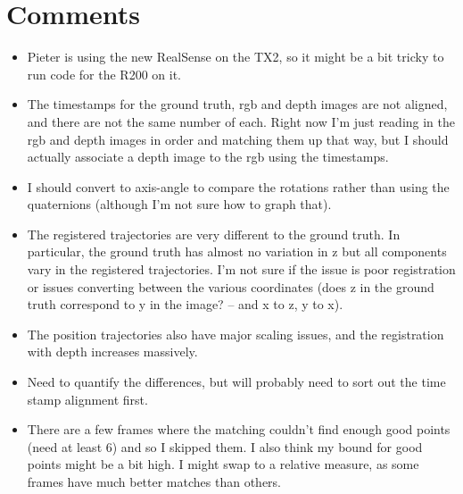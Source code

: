 \documentclass[12pt,a4paper]{article}
\begin{document}
\section{Comments}
\begin{itemize}
\item Pieter is using the new RealSense on the TX2, so it might be a bit tricky to run code for the R200 on it. 
\item The timestamps for the ground truth, rgb and depth images are not aligned, and there are not the same number of each. Right now I'm just reading in the rgb and depth images in order and matching them up that way, but I should actually associate a depth image to the rgb using the timestamps.
\item I should convert to axis-angle to compare the rotations rather than using the quaternions (although I'm not sure how to graph that).
\item The registered trajectories are very different to the ground truth. In particular, the ground truth has almost no variation in z but all components vary in the registered trajectories. I'm not sure if the issue is poor registration or issues converting between the various coordinates (does z in the ground truth correspond to y in the image? -- and x to z, y to x).
\item The position trajectories also have major scaling issues, and the registration with depth increases massively.
\item Need to quantify the differences, but will probably need to sort out the time stamp alignment first.
\item There are a few frames where the matching couldn't find enough good points (need at least 6) and so I skipped them. I also think my bound for good points might be a bit high. I might swap to a relative measure, as some frames have much better matches than others.
\end{itemize}
\end{document}
